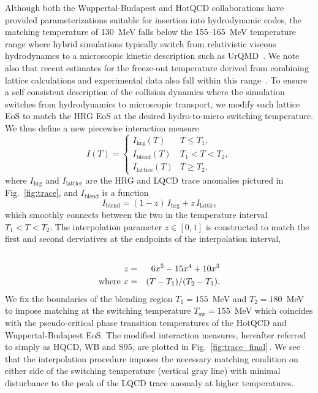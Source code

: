 \documentclass[aps,prc,reprint,amsmath,nofootinbib,superscriptaddress]{revtex4-1}
\begin{document}
Although both the Wuppertal-Budapest and HotQCD collaborations have provided parameterizations suitable for insertion into hydrodynamic codes, the matching temperature of 130~MeV falls below the 155--165~MeV temperature range where hybrid simulations typically switch from relativistic viscous hydrodynamcs to a microscopic kinetic description such as UrQMD~\cite{Bass:1998ca,Bleicher:1999xi}.  
We note also that recent estimates for the freeze-out temperature derived from combining lattice calculations and experimental data also fall within this range~\cite{Bazavov:2014xya, Adare:2015aqk}.  
To ensure a self consistent description of the collision dynamics where the simulation switches from hydrodynamics to microscopic transport, we modify each lattice EoS to match the HRG EoS at the desired hydro-to-micro switching temperature. We thus define a new piecewise interaction measure
\begin{equation}
 \label{interaction}
 I(T) =
  \begin{cases}
   I_\text{hrg}(T)	& T \le T_1, \\
   I_\text{blend}(T)	& T_1 < T < T_2, \\ 
   I_\text{lattice}(T)	& T \ge T_2,
  \end{cases}
\end{equation}
where $I_\text{hrg}$ and $I_\text{lattice}$ are the HRG and LQCD trace anomalies pictured in Fig.~\ref{fig:trace}, and $I_\text{blend}$ is a function 
\begin{equation}
  \label{interpolation}
  I_\text{blend} = (1-z)\, I_\text{hrg} + z\, I_\text{lattice}
\end{equation}
which smoothly connects between the two in the temperature interval $T_1 < T < T_2$. The interpolation parameter $z \in [0,1]$ is constructed to match the first and second derviatives at the endpoints of the interpolation interval,
\begin{eqnarray}
 \label{smoothstep}
 \cr z &=& 6 x^5 - 15 x^4 + 10 x^3 \\
  \text{where } x &=& (T - T_1)/(T_2 - T_1).
\end{eqnarray}
We fix the boundaries of the blending region $T_1=155$~MeV and $T_2=180$~MeV to impose matching at the switching temperature $T_\text{sw} = 155$~MeV which coincides with the pseudo-critical phase transition temperatures of the HotQCD and Wuppertal-Budapest EoS. The modified interaction measures, hereafter referred to simply as HQCD, WB and S95, are plotted in Fig.~\ref{fig:trace_final}\,. We see that the interpolation procedure imposes the necessary matching condition on either side of the switching temperature (vertical gray line) with minimal disturbance to the peak of the LQCD trace anomaly at higher temperatures.
\end{document}
